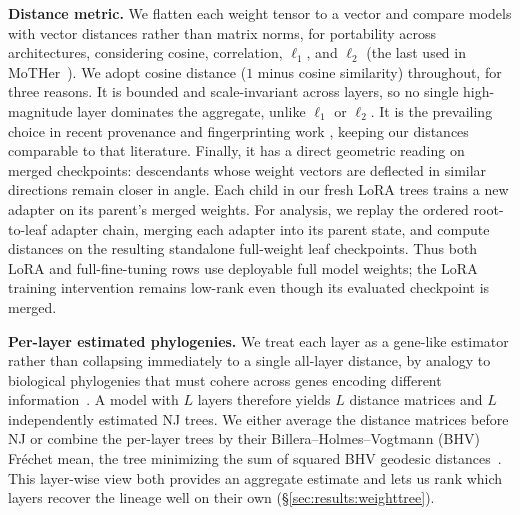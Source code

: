 \documentclass{article}
\theoremstyle{definition}
\theoremstyle{plain}
\begin{document}
\textbf{Distance metric.}\label{sec:framework:metric}
We flatten each weight tensor to a vector and compare models with vector distances rather than matrix
norms, for portability across architectures, considering cosine, correlation, $\ell_1$, and $\ell_2$
(the last used in MoTHer~\citep{horwitz2025mother}). We adopt cosine distance ($1$ minus cosine
similarity) throughout, for three reasons. It is bounded and scale-invariant across layers, so no single
high-magnitude layer dominates the aggregate, unlike $\ell_1$ or $\ell_2$. It is the prevailing choice in
recent provenance and fingerprinting work \citep{zeng2024huref, behavioral2026provenance,
zhu2025independence}, keeping our distances comparable to that literature. Finally, it has a direct geometric
reading on merged checkpoints: descendants whose weight vectors are deflected in similar directions remain closer in angle. Each child in our fresh LoRA trees trains a new adapter on its parent's merged weights. For analysis, we replay the ordered root-to-leaf adapter chain, merging each adapter into its parent state, and compute distances on the resulting standalone full-weight leaf checkpoints. Thus both LoRA and full-fine-tuning rows use deployable full model weights; the LoRA training intervention remains low-rank even though its evaluated checkpoint is merged.





\textbf{Per-layer estimated phylogenies.}
We treat each layer as a gene-like estimator rather than collapsing immediately to a single all-layer
distance, by analogy to biological phylogenies that must cohere across genes encoding different
information~\citep{maddison1997gene}. A model with $L$ layers therefore yields $L$ distance matrices and
$L$ independently estimated NJ trees. We either average the distance matrices before NJ or combine the
per-layer trees by their Billera--Holmes--Vogtmann (BHV) Fr\'echet mean, the tree minimizing the sum of
squared BHV geodesic distances~\citep{billera2001geometry, willis2019confidence}. This layer-wise view
both provides an aggregate estimate and lets us rank which layers recover the lineage well on their own
(\S\ref{sec:results:weighttree}).
\end{document}
